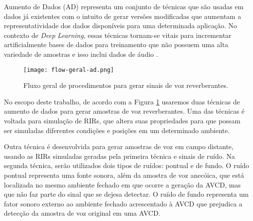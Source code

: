 Aumento de Dados (AD) representa um conjunto de técnicas que são usadas em dados já existentes com o intuito de gerar versões
modificadas que aumentam a representatividade dos dados disponíveis para uma determinada aplicação. 
No contexto de \textit{Deep Learning}, essas técnicas tornam-se vitais para incrementar artificialmente bases de dados
para treinamento que não possuem uma alta variedade de amostras e isso inclui dados de áudio \cite{DL_Data_Aug_sc,Metric_Data_Aug_sc}.

\begin{figure} [H]
    \centering
    \texttt{[image: flow-geral-ad.png]}
    \caption{Fluxo geral de procedimentos para gerar sinais de voz reverberantes.}
    \label{fig:flow-geral}
\end{figure} 

No escopo deste trabalho, de acordo com a Figura \ref{fig:flow-geral} usaremos duas técnicas de aumento de dados para gerar amostras
de voz reverberantes. Uma das técnicas é voltada para simulação de RIRs, que altera suas propriedades para que possam ser simuladas diferentes condições
e posições em um determinado ambiente.

Outra técnica é desenvolvida para gerar amostras de voz em campo distante, usando as RIRs simuladas geradas pela primeira técnica e sinais de ruído.
Na segunda técnica, serão utilizados dois tipos de ruídos: pontual e de fundo.
O ruído pontual representa uma fonte sonora, além da amostra de voz anecóica, que está localizada no mesmo ambiente fechado em que ocorre 
a geração da AVCD, mas que não faz parte do sinal que se dejesa detectar. 
O ruído de fundo representa um fator sonoro externo ao ambiente fechado acrescentado à AVCD que prejudica a detecção da amostra de voz original em uma AVCD.

 

